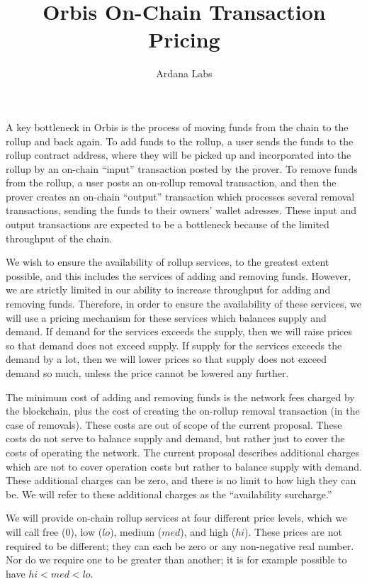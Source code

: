 \documentclass[12pt]{article}
\title{Orbis On-Chain Transaction Pricing}
\author{Ardana Labs}
\begin{document}
\maketitle


A key bottleneck in Orbis is the process of moving funds from the chain to the rollup and back again. To add funds to the rollup, a user sends the funds to the rollup contract address, where they will be picked up and incorporated into the rollup by an on-chain ``input'' transaction posted by the prover. To remove funds from the rollup, a user posts an on-rollup removal transaction, and then the prover creates an on-chain ``output'' transaction which processes several removal transactions, sending the funds to their owners' wallet adresses. These input and output transactions are expected to be a bottleneck because of the limited throughput of the chain. 

We wish to ensure the availability of rollup services, to the greatest extent possible, and this includes the services of adding and removing funds. However, we are strictly limited in our ability to increase throughput for adding and removing funds. Therefore, in order to ensure the availability of these services, we will use a pricing mechanism for these services which balances supply and demand. If demand for the services exceeds the supply, then we will raise prices so that demand does not exceed supply. If supply for the services exceeds the demand by a lot, then we will lower prices so that supply does not exceed demand so much, unless the price cannot be lowered any further.

The minimum cost of adding and removing funds is the network fees charged by the blockchain, plus the cost of creating the on-rollup removal transaction (in the case of removals). These costs are out of scope of the current proposal. These costs do not serve to balance supply and demand, but rather just to cover the costs of operating the network. The current proposal describes additional charges which are not to cover operation costs but rather to balance supply with demand. These additional charges can be zero, and there is no limit to how high they can be. We will refer to these additional charges as the ``availability surcharge.''

We will provide on-chain rollup services at four different price levels, which we will call free ($0$), low ($lo$), medium ($med$), and high ($hi$). These prices are not required to be different; they can each be zero or any non-negative real number. Nor do we require one to be greater than another; it is for example possible to have $hi < med < lo$.
\end{document}
